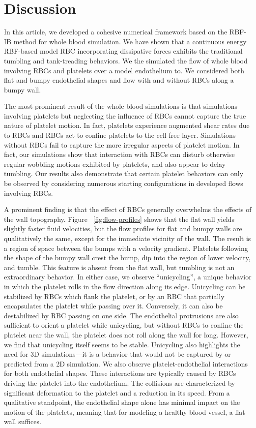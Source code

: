 \section{Discussion}\label{sec:conclusion}

In this article, we developed a cohesive numerical framework based on the RBF-IB method
for whole blood simulation. We have shown that a
continuous energy RBF-based model RBC incorporating dissipative forces exhibits the traditional
tumbling and tank-treading behaviors. We the simulated the flow of whole
blood involving RBCs and platelets over a model endothelium to. We considered both flat
and bumpy endothelial shapes and flow with and without RBCs along a bumpy wall.

The most prominent result of the whole blood simulations is that simulations
involving platelets but neglecting the influence of RBCs cannot capture the true nature of platelet motion.
In fact, platelets experience augmented shear rates due to RBCs and RBCs act to confine platelets to the
cell-free layer. Simulations without RBCs fail to capture the more irregular aspects
of platelet motion. In fact, our simulations show that interaction with RBCs can disturb otherwise regular wobbling motions exhibited by platelets, and also appear to delay tumbling. Our results
also demonstrate that certain platelet behaviors can only be observed by considering
numerous starting configurations in developed flows involving RBCs.

A prominent finding is that the effect of RBCs generally overwhelms the effects of the wall topography. Figure~%
\ref{fig:flow-profiles} shows that the flat wall yields slightly faster fluid velocities,
but the flow profiles for flat and bumpy walls are qualitatively the same, except for the
immediate vicinity of the wall. The result is a region of space between the bumps with a
velocity gradient. Platelets following the shape of the bumpy wall crest the bump, dip
into the region of lower velocity, and tumble. This feature is absent from the flat wall,
but tumbling is not an extraordinary behavior. In either case, we observe ``unicycling'', a unique behavior in
which the platelet rolls in the flow direction along its edge. Unicycling can be
stabilized by RBCs which flank the platelet, or by an RBC that partially encapsulates the
platelet while passing over it. Conversely, it can also be destabilized by RBC passing on one side.
The endothelial protrusions are also sufficient to orient a platelet while unicycling,
but without RBCs to confine the platelet near the wall, the platelet does not roll along
the wall for long. However, we find that unicycling itself seems to be stable. Unicycling also
highlights the need for 3D simulations---it is a behavior that would not be
captured by or predicted from a 2D simulation. We also observe platelet-endothelial interactions
for both endothelial shapes. These interactions are typically caused by RBCs driving the
platelet into the endothelium. The collisions are characterized by significant
deformation to the platelet and a reduction in its speed. From a qualitative standpoint, the
endothelial shape alone has minimal impact on the motion of the platelets, meaning that
for modeling a healthy blood vessel, a flat wall suffices.

